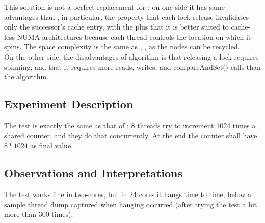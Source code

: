 This  solution is not a perfect replacement for
: on one side it has same advantages than , in
particular, the property that each lock release invalidates only the
successor's cache entry, with the plus that it is better suited to
cache-less NUMA architectures because each thread controls the
location on which it spins. The space complexity is the same as
, , as the nodes can be recycled. \\

On the other side, the disadvantages of  algorithm is that
releasing a lock requires spinning; and that it requires more reads,
writes, and compareAndSet() calls than the  algorithm.

\subsection{Experiment Description}

The test is exactly the same as that of : 8 threads
try to increment 1024 times a shared counter, and they do that
concurrently. At the end the counter shall have $8 * 1024$ as final
value. 

\subsection{Observations and Interpretations}
The test works fine in two-cores, but in 24 cores it hangs time to
time; below a sample thread dump captured when hanging occurred (after
trying the test a bit more than 300 times):

